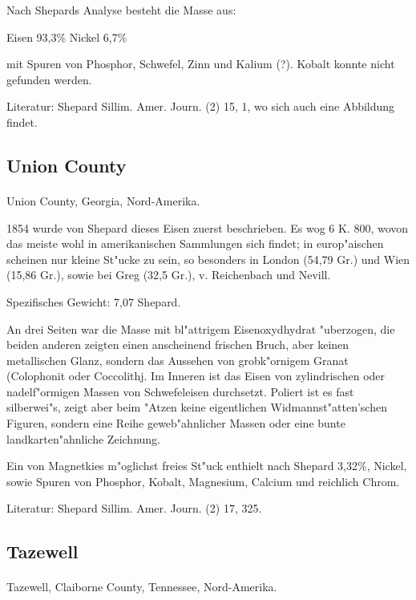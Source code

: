 \documentclass[a4paper, 11pt, oneside]{article}
\begin{document}
Nach Shepards Analyse besteht die Masse aus:

Eisen 93,3\%  
Nickel 6,7\%

mit Spuren von Phosphor, Schwefel, Zinn und Kalium (?). Kobalt konnte nicht gefunden werden.

Literatur: Shepard Sillim. Amer. Journ. (2) 15, 1, wo sich auch eine Abbildung findet.

\subsection{Union County}
\normalsize
\paragraph{}
Union County, Georgia, Nord-Amerika.

1854 wurde von Shepard dieses Eisen zuerst beschrieben. Es wog 6 K. 800, wovon das meiste wohl in amerikanischen Sammlungen sich findet; in europ"aischen scheinen nur kleine St"ucke zu sein, so besonders in London (54,79 Gr.) und Wien (15,86 Gr.), sowie bei Greg (32,5 Gr.), v. Reichenbach und Nevill.

Spezifisches Gewicht: 7,07 Shepard.

An drei Seiten war die Masse mit bl"attrigem Eisenoxydhydrat "uberzogen, die beiden anderen zeigten einen anscheinend frischen Bruch, aber keinen metallischen Glanz, sondern das Aussehen von grobk"ornigem Granat (Colophonit oder Coccolithj. Im Inneren ist das Eisen von zylindrischen oder nadelf"ormigen Massen von Schwefeleisen durchsetzt. Poliert ist es fast silberwei"s, zeigt aber beim "Atzen keine eigentlichen Widmannst"atten'schen Figuren, sondern eine Reihe geweb"ahnlicher Massen oder eine bunte landkarten"ahnliche Zeichnung.

Ein von Magnetkies m"oglichst freies St"uck enthielt nach Shepard 3,32\%, Nickel, sowie Spuren von Phosphor, Kobalt, Magnesium, Calcium und reichlich Chrom.

Literatur: Shepard Sillim. Amer. Journ. (2) 17, 325.

\subsection{Tazewell}
\normalsize
\paragraph{}
Tazewell, Claiborne County, Tennessee, Nord-Amerika.
\end{document}
